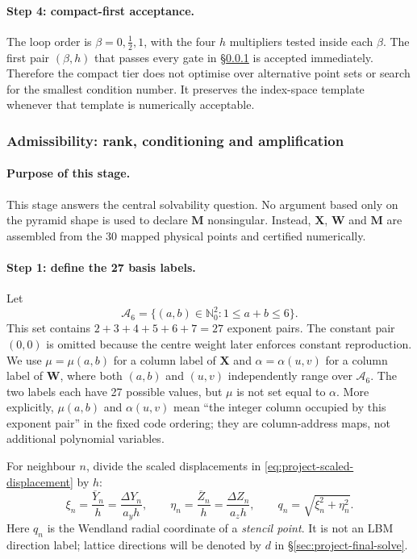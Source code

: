 \documentclass[11pt,a4paper]{article}
\begin{document}
\paragraph{Step 4: compact-first acceptance.}
The loop order is $\beta=0,\tfrac12,1$, with the four $h$ multipliers tested inside each
$\beta$. The first pair $(\beta,h)$ that passes every gate in
\S\ref{sec:project-admissibility} is accepted immediately. Therefore the compact tier
does not optimise over alternative point sets or search for the smallest condition
number. It preserves the index-space template whenever that template is numerically
acceptable.

\subsubsection{Admissibility: rank, conditioning and amplification}
\label{sec:project-admissibility}

\paragraph{Purpose of this stage.}
This stage answers the central solvability question. No argument based only on the
pyramid shape is used to declare $\bm M$ nonsingular. Instead, $\bm X$, $\bm W$ and
$\bm M$ are assembled from the 30 mapped physical points and certified numerically.

\paragraph{Step 1: define the 27 basis labels.}
Let
\begin{equation}
 \mathcal A_6=
 \{(a,b)\in\mathbb{N}_0^2:1\le a+b\le6\}.
\label{eq:project-basis-set}
\end{equation}
This set contains $2+3+4+5+6+7=27$ exponent pairs. The constant pair $(0,0)$ is omitted
because the centre weight later enforces constant reproduction. We use
$\mu=\mu(a,b)$ for a column label of $\bm X$ and
$\alpha=\alpha(u,v)$ for a column label of $\bm W$, where both $(a,b)$ and $(u,v)$
independently range over $\mathcal A_6$. The two labels each have 27 possible values,
but $\mu$ is not set equal to $\alpha$. More explicitly, $\mu(a,b)$ and
$\alpha(u,v)$ mean ``the integer column occupied by this exponent pair'' in the fixed
code ordering; they are column-address maps, not additional polynomial variables.

For neighbour $n$, divide the scaled displacements in
\eqref{eq:project-scaled-displacement} by $h$:
\begin{equation}
 \xi_n=\frac{\overline Y_n}{h}=\frac{\Delta Y_n}{a_yh},\qquad
 \eta_n=\frac{\overline Z_n}{h}=\frac{\Delta Z_n}{a_zh},\qquad
 q_n=\sqrt{\xi_n^2+\eta_n^2}.
\label{eq:project-normalised-coordinates}
\end{equation}
Here $q_n$ is the Wendland radial coordinate of a \emph{stencil point}. It is not an LBM
direction label; lattice directions will be denoted by $d$ in
\S\ref{sec:project-final-solve}.
\end{document}
